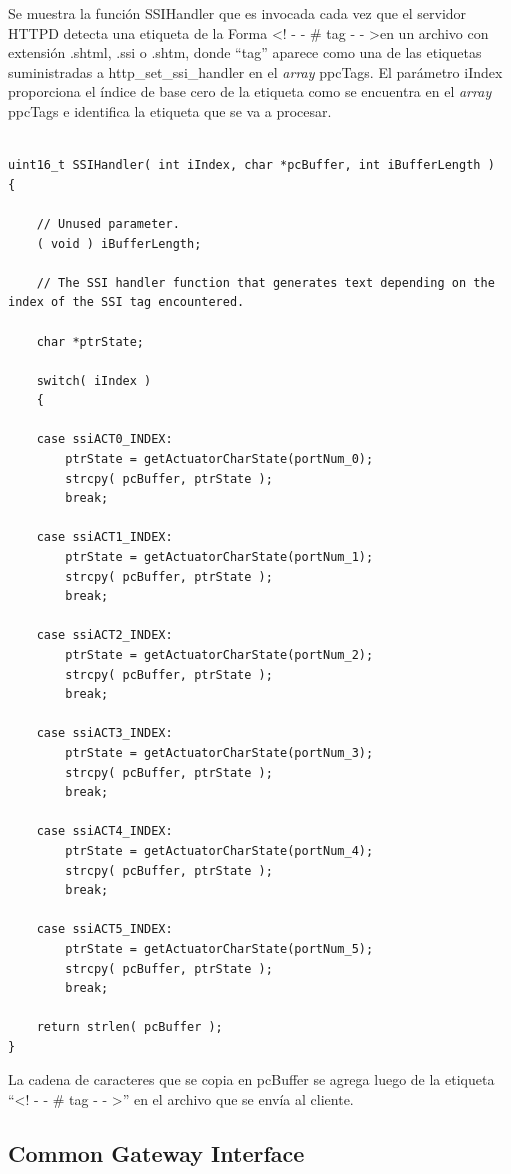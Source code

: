 Se muestra la función SSIHandler que es invocada cada vez que el servidor HTTPD detecta una etiqueta de la Forma \textless ! \-- \-- \# tag \-- \-- \textgreater en un archivo con extensión .shtml, .ssi o .shtm, donde ``tag'' aparece como una de las etiquetas suministradas a http\_set\_ssi\_handler en el \textit{array} ppcTags. El parámetro iIndex proporciona el índice de base cero de la etiqueta como se encuentra en el \textit{array} ppcTags e identifica la etiqueta que se va a procesar.


\begin{lstlisting}[caption={Handler de etiquetas SSI},label={alg:ssihandler}]  % Start your code-block

uint16_t SSIHandler( int iIndex, char *pcBuffer, int iBufferLength )
{

	// Unused parameter. 
	( void ) iBufferLength;

	// The SSI handler function that generates text depending on the index of the SSI tag encountered. 

	char *ptrState;

	switch( iIndex )
	{

	case ssiACT0_INDEX:
		ptrState = getActuatorCharState(portNum_0);
		strcpy( pcBuffer, ptrState );
		break;

	case ssiACT1_INDEX:
		ptrState = getActuatorCharState(portNum_1);
		strcpy( pcBuffer, ptrState );
		break;

	case ssiACT2_INDEX:
		ptrState = getActuatorCharState(portNum_2);
		strcpy( pcBuffer, ptrState );
		break;

	case ssiACT3_INDEX:
		ptrState = getActuatorCharState(portNum_3);
		strcpy( pcBuffer, ptrState );
		break;

	case ssiACT4_INDEX:
		ptrState = getActuatorCharState(portNum_4);
		strcpy( pcBuffer, ptrState );
		break;

	case ssiACT5_INDEX:
		ptrState = getActuatorCharState(portNum_5);
		strcpy( pcBuffer, ptrState );
		break;
	
	return strlen( pcBuffer );
}
\end{lstlisting}

La cadena de caracteres que se copia en pcBuffer se agrega luego de la etiqueta ``\textless ! \-- \-- \# tag \-- \-- \textgreater'' en el archivo que se envía al cliente.



\subsection{Common Gateway Interface}
\label{sec:cgi}

